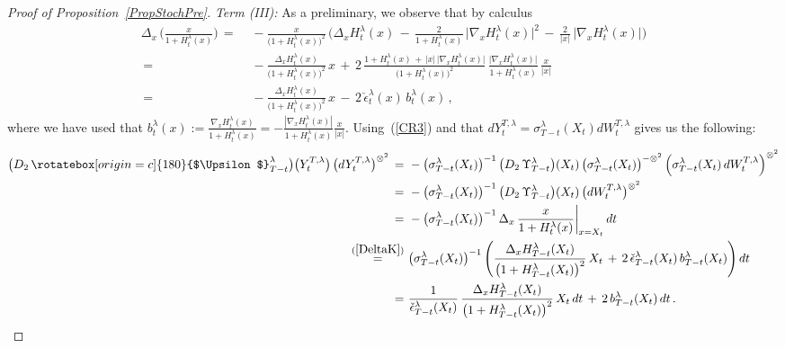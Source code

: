 \documentclass[10pt]{article}
\def\stackrel#1#2{\mathrel{\mathop{#2}\limits^{#1}}}
\numberwithin{equation}{section}
\theoremstyle{definition}
\newcommand\rotUp{\rotatebox[origin=c]{180}{$\Upsilon$}}
\newcommand{\Rphi}{{\Upsilon}}
\newcommand{\Rvarphi}{{\rotUp}}
\begin{document}
\begin{appendix}
\begin{proof}[Proof of Proposition~\ref{PropStochPre}]
    \noindent \textit{Term (III):} As a preliminary, we observe that by calculus
    \begin{align}\label{DeltaK}
    \Delta_x \,\bigg( \frac{x}{1 +H_{t}^{\lambda}(x)    }  \bigg)\,=\,&\,-\frac{  x }{\big(1 +H_{t}^{\lambda}(x)\big)^2  }\,\Bigg( \Delta_x H_{t}^{\lambda}(x)\,-\, \frac{  2 }{1 +H_{t}^{\lambda}(x) }\,\big| \nabla_x H_{t}^{\lambda}(x)  \big|^2\,-\,\frac{2}{|x|}\,\big|   \nabla_x H_{t}^{\lambda}(x)\big| \Bigg) \nonumber \\ \,=\,&\,-\frac{ \Delta_x H_{t}^{\lambda}(x)  }{\big(1 +H_{t}^{\lambda}(x)\big)^2  }\,x \,+\, 2\, \frac{ 1+ H_{t}^{\lambda}(x)\,+\,|x|\,\big| \nabla_x H_{t}^{\lambda}(x)  \big| }{ \big(1 +H_{t}^{\lambda}(x)\big)^2 }\,\frac{  \big| \nabla_x H_{t}^{\lambda}(x) \big|  }{1 +H_{t}^{\lambda}(x) }\,\frac{ x}{|x| } \nonumber  \\ \,=\,&\,-\frac{ \Delta_x H_{t}^{\lambda}(x)  }{\big(1 +H_{t}^{\lambda}(x)\big)^2  }\,x \,-\, 2\,\check{\epsilon}_{t}^{\lambda}(x)\,b_t^{\lambda}(x)\,,
    \end{align}
where we have used that $b_t^{\lambda}(x):=\frac{ \nabla_x H_{t}^{\lambda}(x)  }{1+H_{t}^{\lambda}(x)   }=-\frac{  | \nabla_x H_{t}^{\lambda}(x) |  }{1 +H_{t}^{\lambda}(x) } \frac{ x}{|x| }$. Using~(\ref{CR3}) and that $dY^{T,\lambda}_t =\sigma_{T-t}^{\lambda}( X_t  )d  W^{T,\lambda}_t$ gives us the following:
    \begin{align}\label{I3}
\big(D_2 \,\Rvarphi_{T-t}^{\lambda}\big)\big( Y^{T,\lambda}_t\big)\, \big(dY^{T,\lambda}_t\big)^{\otimes^2} \,=\,   & \,  -\big(\sigma_{T-t}^{\lambda}(X_t) \big)^{-1}\,\big(D_2\, \Rphi_{T-t}^{\lambda}\big)( X_t ) \, \big(\sigma_{T-t}^{\lambda}(X_t) \big)^{-\otimes^2} \, \Big(\sigma_{T-t}^{\lambda}(X_t)\,d  W^{T,\lambda}_t\Big)^{\otimes^2}\nonumber \\
\,=\,   & \,  -\big(\sigma_{T-t}^{\lambda}(X_t)\big)^{-1}\,\big(D_2 \,\Rphi_{T-t}^{\lambda}\big)( X_t )   \, \big(d  W^{T,\lambda}_t\big)^{\otimes^2}\nonumber \\
\,=\,   & \,  - \big(\sigma_{T-t}^{\lambda}(X_t)\big)^{-1} \,\Delta_x\, \frac{x}{1 +H_{t}^{\lambda}(x)    }  \bigg|_{x=X_t} \, dt\nonumber \\
\,\stackrel{(\ref{DeltaK})}{=}\,&\,\big(\sigma_{T-t}^{\lambda}(X_t)\big)^{-1} \,\Bigg(\frac{ \Delta_x H_{T-t}^{\lambda}(X_t)  }{\big(1 +H_{T-t}^{\lambda}(X_t)\big)^2  }\,X_t \,+\, 2\,\check{\epsilon}_{T-t}^{\lambda}(X_t)\,b_{T-t}^{\lambda}(X_t) \Bigg)  \,dt \nonumber
\\
\,=\,& \,\frac{1}{\check{\epsilon}_{T-t}^{\lambda}(X_t)  } \, \frac{ \Delta_x H_{T-t}^{\lambda}(X_t)  }{\big(1 +H_{T-t}^{\lambda}(X_t)\big)^2  }\,X_t \,dt\,+\, 2\,b_{T-t}^{\lambda}(X_t)    \,dt\,. 

\end{align}
\end{proof}
\end{appendix}
\end{document}
